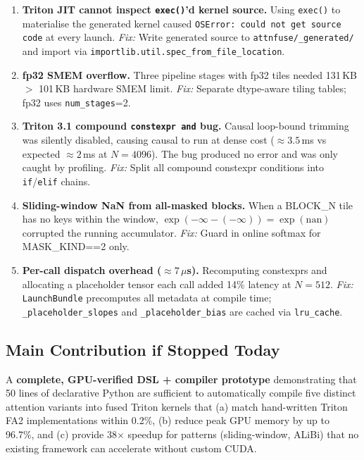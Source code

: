 \documentclass[12pt]{article}
\begin{document}
\begin{enumerate}[leftmargin=1.5em]
  \item \textbf{Triton JIT cannot inspect \texttt{exec()}'d kernel source.}
    Using \texttt{exec()} to materialise the generated kernel caused
    \texttt{OSError: could not get source code} at every launch.
    \textit{Fix:} Write generated source to
    \texttt{attnfuse/\_generated/} and import via
    \texttt{importlib.util.spec\_from\_file\_location}.

  \item \textbf{fp32 SMEM overflow.}
    Three pipeline stages with fp32 tiles needed 131\,KB $>$ 101\,KB
    hardware SMEM limit.  \textit{Fix:} Separate dtype-aware tiling tables;
    fp32 uses \texttt{num\_stages}=2.

  \item \textbf{Triton 3.1 compound \texttt{constexpr and} bug.}
    Causal loop-bound trimming was silently disabled, causing causal to run
    at dense cost ($\approx3.5$\,ms vs expected $\approx2$\,ms at
    $N{=}4096$).  The bug produced no error and was only caught by profiling.
    \textit{Fix:} Split all compound constexpr conditions into
    \texttt{if}/\texttt{elif} chains.

  \item \textbf{Sliding-window NaN from all-masked blocks.}
    When a BLOCK\_N tile has no keys within the window,
    $\exp(-\infty - (-\infty)) = \exp(\mathrm{nan})$ corrupted the running
    accumulator.  \textit{Fix:} Guard in online softmax for
    MASK\_KIND==2 only.

  \item \textbf{Per-call dispatch overhead ($\approx7\,\mu$s).}
    Recomputing constexprs and allocating a placeholder tensor each call
    added 14\% latency at $N{=}512$.  \textit{Fix:} \texttt{LaunchBundle}
    precomputes all metadata at compile time; \texttt{\_placeholder\_slopes}
    and \texttt{\_placeholder\_bias} are cached via \texttt{lru\_cache}.
\end{enumerate}

\subsection{Main Contribution if Stopped Today}

A \textbf{complete, GPU-verified DSL + compiler prototype} demonstrating
that 50 lines of declarative Python are sufficient to automatically compile
five distinct attention variants into fused Triton kernels that (a) match
hand-written Triton FA2 implementations within 0.2\%, (b) reduce peak GPU
memory by up to 96.7\%, and (c) provide 38$\times$ speedup for patterns
(sliding-window, ALiBi) that no existing framework can accelerate without
custom CUDA.
\end{document}
